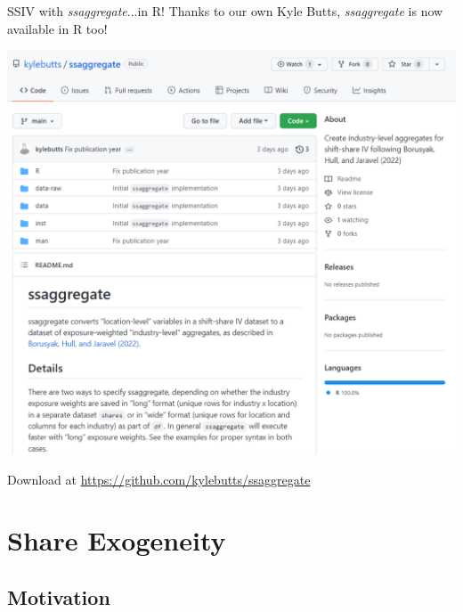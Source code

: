 \documentclass{beamer}
\begin{document}
\begin{frame}{SSIV with \emph{ssaggregate}...in R!}
\vspace{-0.4cm}
Thanks to our own Kyle Butts, \emph{ssaggregate} is now available in R too!

\begin{center}
\includegraphics[height=0.7\textheight]{lecture_includes/ssaggregate_R.png}
\end{center}

Download at \url{https://github.com/kylebutts/ssaggregate}

\end{frame}

\section{Share Exogeneity}

\subsection{Motivation}
\end{document}
